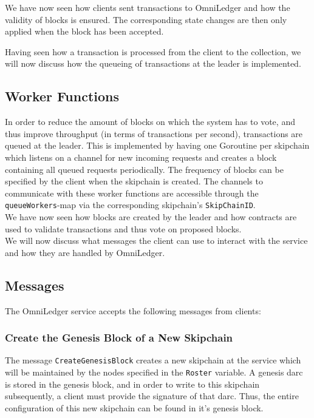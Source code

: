 \documentclass[11pt, a4paper, twoside, openright]{article} %
\begin{document}
We have now seen how clients sent transactions to OmniLedger and how the
validity of blocks is ensured. The corresponding state changes are then only
applied when the block has been accepted.

Having seen how a transaction is processed from the client to the collection,
we will now discuss how the queueing of transactions at the leader is
implemented.

\subsection{Worker Functions}
In order to reduce the amount of blocks on which the system has to vote,
and thus improve throughput (in terms of transactions per second),
transactions are queued at the leader.
This is implemented by having one Goroutine per skipchain which listens on a
channel for new incoming requests and creates a block containing all queued
requests periodically. The frequency of blocks can be specified by the client
when the skipchain is created. The channels to communicate with these worker
functions are accessible through the \texttt{queueWorkers}-map via the
corresponding skipchain's \texttt{SkipChainID}.\\

We have now seen how blocks are created by the leader and how contracts are
used to validate transactions and thus vote on proposed blocks.\\

We will now discuss what messages the client can use to interact with the
service and how they are handled by OmniLedger.

\subsection{Messages}

The OmniLedger service accepts the following messages from clients:\\

\subsubsection{Create the Genesis Block of a New Skipchain}

The message \texttt{CreateGenesisBlock} creates a new skipchain at the service
which will be maintained by the nodes specified in the \texttt{Roster}
variable.
A genesis darc is stored in the genesis block, and in order to write to this
skipchain subsequently,
a client must provide the signature of that darc. Thus, the entire
configuration of this new skipchain can be found in it's genesis block.
\end{document}
